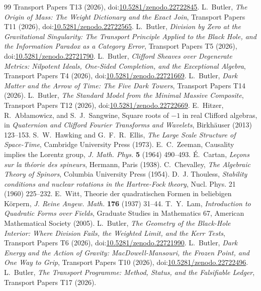 \documentclass[11pt]{article}
\theoremstyle{definition}
\theoremstyle{plain}
\begin{document}
\begin{thebibliography}{99}
Transport Papers T13 (2026), doi:\href{https://doi.org/10.5281/zenodo.22722845}{10.5281/zenodo.22722845}.
 L.~Butler,
\emph{The Origin of Mass: The Weight Dictionary and the Exact Join},
Transport Papers T11 (2026), doi:\href{https://doi.org/10.5281/zenodo.22722565}{10.5281/zenodo.22722565}.
 L.~Butler,
\emph{Division by Zero at the Gravitational Singularity: The Transport Principle Applied to the Black Hole, and the Information Paradox as a Category Error},
Transport Papers T5 (2026), doi:\href{https://doi.org/10.5281/zenodo.22721790}{10.5281/zenodo.22721790}.
 L.~Butler,
\emph{Clifford Sheaves over Degenerate Metrics: Nilpotent Ideals, One-Sided Completion, and the Exceptional Algebra},
Transport Papers T4 (2026), doi:\href{https://doi.org/10.5281/zenodo.22721669}{10.5281/zenodo.22721669}.
 L.~Butler,
\emph{Dark Matter and the Arrow of Time: The Five Dark Towers},
Transport Papers T14 (2026).
 L.~Butler,
\emph{The Standard Model from the Minimal Massive Composite},
Transport Papers T12 (2026), doi:\href{https://doi.org/10.5281/zenodo.22722669}{10.5281/zenodo.22722669}.
 E.~Hitzer, R.~Ab\l{}amowicz, and S.~J.~Sangwine,
Square roots of $-1$ in real Clifford algebras,
in \emph{Quaternion and Clifford Fourier Transforms and Wavelets}, Birkh\"auser (2013) 123--153.
 S.~W.~Hawking and G.~F.~R.~Ellis,
\emph{The Large Scale Structure of Space-Time},
Cambridge University Press (1973).
 E.~C.~Zeeman,
Causality implies the Lorentz group,
\emph{J. Math. Phys.} \textbf{5} (1964) 490--493.
 \'E.~Cartan,
\emph{Le\c{c}ons sur la th\'eorie des spineurs},
Hermann, Paris (1938).
 C.~Chevalley,
\emph{The Algebraic Theory of Spinors},
Columbia University Press (1954).
 D.~J. Thouless,
\emph{Stability conditions and nuclear rotations in the Hartree-Fock theory},
Nucl. Phys. 21 (1960) 225--232.
 E.~Witt,
Theorie der quadratischen Formen in beliebigen K\"orpern,
\emph{J. Reine Angew. Math.} \textbf{176} (1937) 31--44.
 T.~Y.~Lam,
\emph{Introduction to Quadratic Forms over Fields},
Graduate Studies in Mathematics 67, American Mathematical Society (2005).
 L.~Butler,
\emph{The Geometry of the Black-Hole Interior: Where Division Fails, the Weighted Limit, and the Kerr Tests},
Transport Papers T6 (2026), doi:\href{https://doi.org/10.5281/zenodo.22721990}{10.5281/zenodo.22721990}.
 L.~Butler,
\emph{Dark Energy and the Action of Gravity: MacDowell-Mansouri, the Frozen Point, and One Way to Grip},
Transport Papers T10 (2026), doi:\href{https://doi.org/10.5281/zenodo.22722496}{10.5281/zenodo.22722496}.
 L.~Butler,
\emph{The Transport Programme: Method, Status, and the Falsifiable Ledger},
Transport Papers T17 (2026).
\end{thebibliography}
\end{document}
